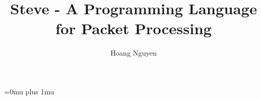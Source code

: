 \documentclass[ms,cpyr,lof,lot]{uathesis}
\title{Steve - A Programming Language for Packet Processing}
\author{Hoang Nguyen}
\def\E{\epsilon}
\begin{document}
\maketitle










\expandafter\def\expandafter\UrlBreaks\expandafter{\UrlBreaks%
  \do\a\do\b\do\c\do\d\do\e\do\f\do\g\do\h\do\i\do\j%
  \do\k\do\l\do\m\do\n\do\o\do\p\do\q\do\r\do\s\do\t%
  \do\u\do\v\do\w\do\x\do\y\do\z\do\A\do\B\do\C\do\D%
  \do\E\do\F\do\G\do\H\do\I\do\J\do\K\do\L\do\M\do\N%
  \do\O\do\P\do\Q\do\R\do\S\do\T\do\U\do\V\do\W\do\X%
  \do\Y\do\Z\do\*\do\-\do\~\do\'\do\"\do\-\do\/}%
  
\Urlmuskip=0mu plus 1mu\relax





% 

% 
\end{document}

